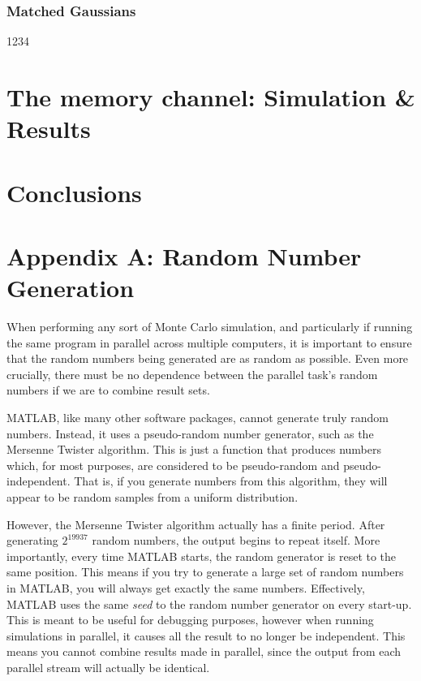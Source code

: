 \documentclass[11pt]{article}
\numberwithin{equation}{subsection}
\begin{document}
\subsubsection{Matched Gaussians}
1234

\section{The memory channel: Simulation \& Results}

\section{Conclusions}

{}
\section*{Appendix A: Random Number Generation}
When performing any sort of Monte Carlo simulation, and particularly if running the same program in parallel across multiple computers, it is important to ensure that the random numbers being generated are as random as possible. Even more crucially, there must be no dependence between the parallel task's random numbers if we are to combine result sets.

MATLAB, like many other software packages, cannot generate truly random numbers. Instead, it uses a pseudo-random number generator, such as the Mersenne Twister algorithm. This is just a function that produces numbers which, for most purposes, are considered to be pseudo-random and pseudo-independent. That is, if you generate numbers from this algorithm, they will appear to be random samples from a uniform distribution. 

However, the Mersenne Twister algorithm actually has a finite period. After generating $2^{19937}$ random numbers, the output begins to repeat itself. More importantly, every time MATLAB starts, the random generator is reset to the same position. This means if you try to generate a large set of random numbers in MATLAB, you will always get exactly the same numbers. Effectively, MATLAB uses the same \textit{seed} to the random number generator on every start-up. This is meant to be useful for debugging purposes, however when running simulations in parallel, it causes all the result to no longer be independent. This means you cannot combine results made in parallel, since the output from each parallel stream will actually be identical.
\end{document}
